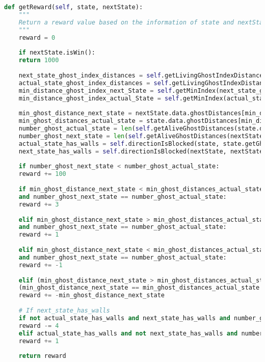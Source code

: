 \documentclass[11pt]{exam}
\begin{document}
\begin{lstlisting}[language=python, basicstyle=\footnotesize]
def getReward(self, state, nextState):
	"""
	Return a reward value based on the information of state and nextState
	"""	
	reward = 0
	
	if nextState.isWin():
	return 1000
	
	next_state_ghost_index_distances = self.getLivingGhostIndexDistances(nextState)
	actual_state_ghost_index_distances = self.getLivingGhostIndexDistances(nextState)
	min_distance_ghost_index_next_State = self.getMinIndex(next_state_ghost_index_distances)[0]
	min_distance_ghost_index_actual_State = self.getMinIndex(actual_state_ghost_index_distances)[0]
	
	min_ghost_distance_next_state = nextState.data.ghostDistances[min_distance_ghost_index_next_State]
	min_ghost_distances_actual_state = state.data.ghostDistances[min_distance_ghost_index_actual_State]
	number_ghost_actual_state = len(self.getAliveGhostDistances(state.data.ghostDistances))
	number_ghost_next_state = len(self.getAliveGhostDistances(nextState.data.ghostDistances))
	actual_state_has_walls = self.directionIsBlocked(state, state.getGhostPositions()[min_distance_ghost_index_next_State])
	next_state_has_walls = self.directionIsBlocked(nextState, nextState.getGhostPositions()[min_distance_ghost_index_next_State])
	
	if number_ghost_next_state < number_ghost_actual_state:
	reward += 100
	
	if min_ghost_distance_next_state < min_ghost_distances_actual_state and not actual_state_has_walls \
	and number_ghost_next_state == number_ghost_actual_state:
	reward += 3
	
	elif min_ghost_distance_next_state > min_ghost_distances_actual_state and actual_state_has_walls \
	and number_ghost_next_state == number_ghost_actual_state:
	reward += 1
	
	elif min_ghost_distance_next_state < min_ghost_distances_actual_state and actual_state_has_walls \
	and number_ghost_next_state == number_ghost_actual_state:
	reward += -1
	
	elif (min_ghost_distance_next_state > min_ghost_distances_actual_state and not actual_state_has_walls) or \
	(min_ghost_distance_next_state == min_ghost_distances_actual_state and number_ghost_next_state == number_ghost_actual_state):
	reward += -min_ghost_distance_next_state
	
	# If next_state_has_walls
	if not actual_state_has_walls and next_state_has_walls and number_ghost_next_state == number_ghost_actual_state:
	reward -= 4
	elif actual_state_has_walls and not next_state_has_walls and number_ghost_next_state == number_ghost_actual_state:
	reward += 1
	
	return reward
\end{lstlisting}
\end{document}
